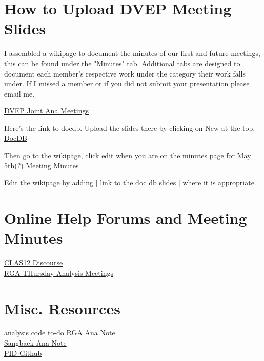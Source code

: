 \section{How to Upload DVEP Meeting Slides}
    I assembled a wikipage to document the minutes of our first and future meetings, this can be found under the "Minutes" tab. Additional tabs are designed to document each member's respective work under the category their work falls under. If I missed a member or if you did not submit your presentation please email me.
    
    \href{https://clasweb.jlab.org/wiki/index.php/DVCS/DVMP_Joint_Analysis_Group#tab=Overview}{DVEP Joint Ana Meetings}
    
    
    Here's the link to docdb. Upload the slides there by clicking on New at the top.
    \href{https://clas12-docdb.jlab.org/cgi-bin/DocDB/private/DocumentDatabase}{DocDB}
    
    Then go to the wikipage, click edit when you are on the minutes page for May 5th(?)
    \href{https://clasweb.jlab.org/wiki/index.php/DVCS/DVMP_Joint_Analysis_Group#tab=Minutes}{Meeting Minutes}
    
    Edit the wikipage by adding
    [ link to the doc db slides ]
    where it is appropriate.
    
\section{Online Help Forums and Meeting Minutes}
    \href{https://clas12.discourse.group/latest}{CLAS12 Discourse}\\
    \href{https://clas12-docdb.jlab.org/cgi-bin/DocDB/private/DisplayMeeting?conferenceid=9}{RGA THursday Analysis Meetings}
    
    
    
\section{Misc. Resources}

    \href{https://github.com/robertej19/analysis_code/projects/1}{analysis code to-do}
    \href{https://www.overleaf.com/project/5ea737720942930001ff5e9c}{RGA Ana Note}\\
    \href{https://www.overleaf.com/project/5f8a6c3689df1e0001ce708c}{Sangbaek Ana Note}\\
    \href{https://github.com/drewkenjo/analysis_code/blob/master/pid/electron/Electron.groovy}{PID Github}
 
 
